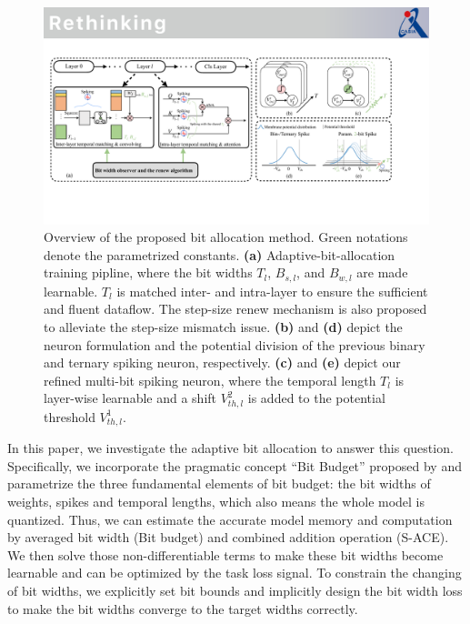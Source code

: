 \begin{figure}[t]
  \centering
  \includegraphics[width= 16cm]{figs/overview.pdf}
  \caption{Overview of the  proposed  bit allocation method. Green notations denote the parametrized constants. \textbf{(a)} Adaptive-bit-allocation training pipline, where the bit widths $T_l$, $B_{s,l}$, and $B_{w,l}$ are made learnable. $T_l$ is matched inter- and intra-layer to ensure the sufficient and fluent dataflow. The step-size renew mechanism is also proposed to alleviate the step-size mismatch issue. \textbf{(b)} and \textbf{(d)} depict the neuron formulation and the potential division of the previous binary and ternary spiking neuron, respectively. \textbf{(c)} and \textbf{(e)} depict our refined multi-bit spiking neuron, where the temporal length $T_l$ is layer-wise learnable and a shift $V^2_{th,l}$ is added to the potential threshold $V^1_{th,l}$. }
  \label{fig:overview}
\end{figure}
In this paper, we investigate the adaptive bit allocation to answer this question. Specifically, we incorporate the pragmatic concept “Bit Budget” proposed by  \cite{shen2024conventional} and parametrize the three fundamental elements of bit budget: the bit widths of weights, spikes and temporal lengths, which also means the whole model is quantized. Thus, we can estimate the accurate model memory and computation by averaged bit width (Bit budget) and combined addition operation (S-ACE).
We then solve those non-differentiable terms to make these bit widths become learnable and can be optimized by the task loss signal. 
To constrain the changing of bit widths, we explicitly set bit bounds and implicitly design the bit width  loss to make the bit widths converge to the target widths correctly.

